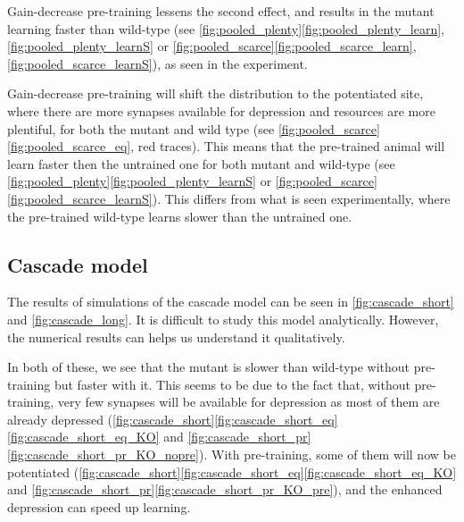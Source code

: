 \documentclass[12pt]{article}
\begin{document}
Gain-decrease pre-training lessens the second effect, and results in the mutant learning faster than wild-type (see \autoref{fig:pooled_plenty}\ref{fig:pooled_plenty_learn},\ref{fig:pooled_plenty_learnS} or \autoref{fig:pooled_scarce}\ref{fig:pooled_scarce_learn},\ref{fig:pooled_scarce_learnS}), as seen in the experiment.

Gain-decrease pre-training will shift the distribution to the potentiated site, where there are more synapses available for depression and resources are more plentiful, for both the mutant and wild type (see \autoref{fig:pooled_scarce}\ref{fig:pooled_scarce_eq}, red traces).
This means that the pre-trained animal will learn faster then the untrained one for both mutant and wild-type (see \autoref{fig:pooled_plenty}\ref{fig:pooled_plenty_learnS} or \autoref{fig:pooled_scarce}\ref{fig:pooled_scarce_learnS}).
This differs from what is seen experimentally, where the pre-trained wild-type learns slower than the untrained one.


\subsection{Cascade model}\label{sec:cascade}





The results of simulations of the cascade model can be seen in \autoref{fig:cascade_short} and \autoref{fig:cascade_long}.
It is difficult to study this model analytically.
However, the numerical results can helps us understand it qualitatively.

In both of these, we see that the mutant is slower than wild-type without pre-training but faster with it.
This seems to be due to the fact that, without pre-training, very few synapses will be available for depression as most of them are already depressed (\autoref{fig:cascade_short}\ref{fig:cascade_short_eq}\ref{fig:cascade_short_eq_KO} and \ref{fig:cascade_short_pr}\ref{fig:cascade_short_pr_KO_nopre}).
With pre-training, some of them will now be potentiated (\autoref{fig:cascade_short}\ref{fig:cascade_short_eq}\ref{fig:cascade_short_eq_KO} and \ref{fig:cascade_short_pr}\ref{fig:cascade_short_pr_KO_pre}), and the enhanced depression can speed up learning.
\end{document}
